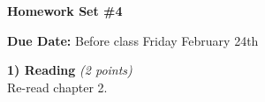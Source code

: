 

\def\xyprime{\ensuremath{\begin{pmatrix} x' \\ y' \end{pmatrix}}}



\thispagestyle{fancy}






\begin{center}
{\huge \textbf{Homework Set \#4}}
\large

{\textbf{ Due Date:} Before class Friday February 24th  }
\end{center}

\textbf{1) Reading } \hfill \textit{(2 points)}\\
Re-read chapter 2.

\vspace*{0.25in}


